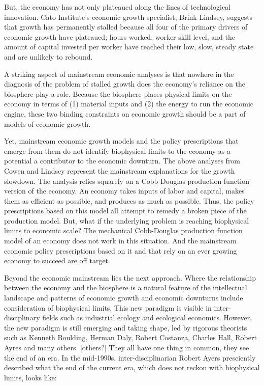 But, the economy has not only plateaued along the lines of technological innovation. Cato Institute's economic growth specialist, Brink Lindsey, suggests that growth has permanently stalled because all four of the primary drivers of economic growth have plateaued; hours worked, worker skill level, and the amount of capital invested per worker have reached their low, slow, steady state and are unlikely to rebound.\cite{lindsey2013} 

A striking aspect of mainstream economic analyses is that nowhere in the diagnosis of the problem of stalled growth does the economy's reliance on the biosphere play a role. Because the biosphere places physical limits on the economy in terms of (1) material inputs and (2) the energy to run the economic engine, these two binding constraints on economic growth should be a part of models of economic growth. 

Yet, mainstream economic growth models and the policy prescriptions that emerge from them do not identify biophysical limits to the economy as a potential a contributor to the economic downturn. The above analyses from Cowen\cite{Cowen2011} and Lindsey \cite{lindsey2013} represent the mainstream explanations for the growth slowdown. 
The analysis relies squarely on a Cobb-Douglas production function version of the economy. An economy takes inputs of 
labor and capital, makes them as  efficient as possible, and produces as much as possible.  Thus, the policy prescriptions based on this model all attempt to remedy a broken piece of the production model. But, what if the underlying problem is 
reaching biophysical limits to economic scale? The mechanical Cobb-Douglas production function model of an economy 
does not work in this situation. And the mainstream economic policy prescriptions based on it and that rely
on an ever growing economy to succeed are off target. 

Beyond the economic mainstream lies the next approach. Where the relationship between the economy and the biosphere is a natural feature of the intellectual landscape and patterns of economic growth and economic downturns  include consideration of biophysical limits. This new paradigm is visible in inter-disciplinary fields such as industrial ecology and
ecological economics. However, the new paradigm is still emerging and taking shape, led by rigorous
theorists such as Kenneth Boulding, Herman Daly, Robert Costanza, Charles Hall, Robert Ayres and many others. [others?]  
They all have one thing in common, they see the end of an era.   In the mid-1990s, inter-disciplinarian Robert Ayers presciently described what the end of the current era, which does not reckon with biophysical limits, looks like:  

